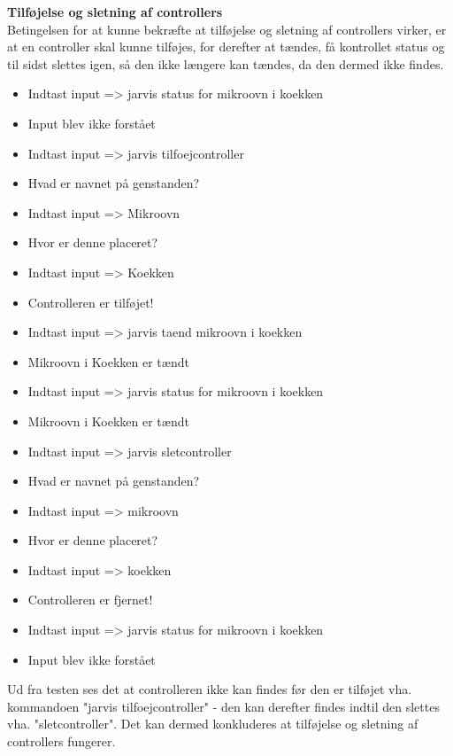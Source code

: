 {\bf Tilføjelse og sletning af controllers}\\
Betingelsen for at kunne bekræfte at tilføjelse og sletning af controllers virker, er at en controller skal kunne tilføjes, for derefter at tændes, få kontrollet status og til sidst slettes igen, så den ikke længere kan tændes, da den dermed ikke findes.
\begin{itemize}[itemsep=0ex,topsep=1ex]
    \item Indtast input => jarvis status for mikroovn i koekken
    \item Input blev ikke forstået
    \item Indtast input => jarvis tilfoejcontroller
    \item Hvad er navnet på genstanden?
    \item Indtast input => Mikroovn
    \item Hvor er denne placeret?
    \item Indtast input => Koekken
    \item Controlleren er tilføjet!
    \item Indtast input => jarvis taend mikroovn i koekken
    \item Mikroovn i Koekken er tændt
    \item Indtast input => jarvis status for mikroovn i koekken
    \item Mikroovn i Koekken er tændt
    \item Indtast input => jarvis sletcontroller
    \item Hvad er navnet på genstanden?
    \item Indtast input => mikroovn
    \item Hvor er denne placeret?
    \item Indtast input => koekken
    \item Controlleren er fjernet!
    \item Indtast input => jarvis status for mikroovn i koekken
    \item Input blev ikke forstået
\end{itemize}

Ud fra testen ses det at controlleren ikke kan findes før den er tilføjet vha. kommandoen "jarvis tilfoejcontroller" - den kan derefter findes indtil den slettes vha. "sletcontroller". Det kan dermed konkluderes at tilføjelse og sletning af controllers fungerer.\\


